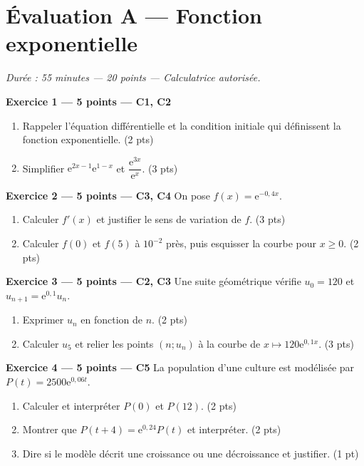 \section*{Évaluation A — Fonction exponentielle}
\textit{Durée : 55 minutes — 20 points — Calculatrice autorisée.}

\textbf{Exercice 1 — 5 points — C1, C2}
\begin{enumerate}
\item Rappeler l'équation différentielle et la condition initiale qui définissent la fonction exponentielle. \hfill(2 pts)
\item Simplifier $\mathrm{e}^{2x-1}\mathrm{e}^{1-x}$ et $\dfrac{\mathrm{e}^{3x}}{\mathrm{e}^{x}}$. \hfill(3 pts)
\end{enumerate}

\textbf{Exercice 2 — 5 points — C3, C4}
On pose $f(x)=\mathrm{e}^{-0{,}4x}$.
\begin{enumerate}
\item Calculer $f'(x)$ et justifier le sens de variation de $f$. \hfill(3 pts)
\item Calculer $f(0)$ et $f(5)$ à $10^{-2}$ près, puis esquisser la courbe pour $x\geqslant0$. \hfill(2 pts)
\end{enumerate}

\textbf{Exercice 3 — 5 points — C2, C3}
Une suite géométrique vérifie $u_0=120$ et $u_{n+1}=\mathrm{e}^{0{,}1}u_n$.
\begin{enumerate}
\item Exprimer $u_n$ en fonction de $n$. \hfill(2 pts)
\item Calculer $u_5$ et relier les points $(n;u_n)$ à la courbe de $x\mapsto120\mathrm{e}^{0{,}1x}$. \hfill(3 pts)
\end{enumerate}

\textbf{Exercice 4 — 5 points — C5}
La population d'une culture est modélisée par $P(t)=2500\mathrm{e}^{0{,}06t}$.
\begin{enumerate}
\item Calculer et interpréter $P(0)$ et $P(12)$. \hfill(2 pts)
\item Montrer que $P(t+4)=\mathrm{e}^{0{,}24}P(t)$ et interpréter. \hfill(2 pts)
\item Dire si le modèle décrit une croissance ou une décroissance et justifier. \hfill(1 pt)
\end{enumerate}
